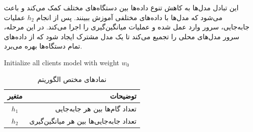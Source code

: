 این تبادل مدل‌ها به کاهش تنوع داده‌ها بین دستگاه‌های مختلف کمک می‌کند و باعث می‌شود که مدل‌ها با داده‌های مختلفی آموزش ببینند. پس از انجام
$h_2$
عملیات جابه‌جایی، سرور وارد عمل شده و عملیات میانگین‌گیری را اجرا می‌کند. در این مرحله، سرور مدل‌های محلی را تجمیع می‌کند تا یک مدل مشترک ایجاد شود که از داده‌های تمام دستگاه‌ها بهره‌ می‌برد.


\begin{LTR}
	\begin{algorithm}[t]
		\begin{RTL}
			\caption{%
				جابه‌جایی فدرال
				\cite{chiu2020semisupervised}
			}
			\label{algo_FedSwap}
		\end{RTL}
		
		\begin{latin}
			Initialize all clients model with weight $w_0$\;
		\end{latin}
	\end{algorithm}
\end{LTR}


\begin{table}[h]
	\centering
	\caption{نمادهای مختص الگوریتم
	}
	\label{tabel_FedSwapNotations}
	\begin{tabular}{cr}
		\hline
		متغیر & توضیحات \\
		\hline
		$h_1$ & تعداد گام‌ها بین هر جابه‌جایی \\
		$h_2$ & تعداد جابه‌جایی‌ها بین هر میانگین‌گیری \\
		\hline
	\end{tabular}
\end{table}



